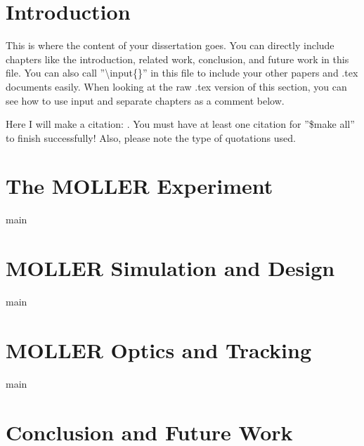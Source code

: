 \chapter{Introduction}
This is where the content of your dissertation goes.  You can directly include chapters like the introduction, related work, conclusion, and future work in this file.  You can also call ''\textbackslash input\{\}'' in this file to include your other papers and .tex documents easily.  When looking at the raw .tex version of this section, you can see how to use input and separate chapters as a comment below.

Here I will make a citation: \cite{mobile_marketshare}.  You must have at least one citation for ''\$make all'' to finish successfully!  Also, please note the type of quotations used.




%


\chapter{The MOLLER Experiment}
\label{cht:MOLLER}
{main}
\setcounter{equation}{0}
\cleardoublepage

\chapter{MOLLER Simulation and Design}
\label{cht:MOLLER_sim_des}
{main}
\setcounter{equation}{0}
\cleardoublepage

\chapter{MOLLER Optics and Tracking}
\label{cht:MOLLER_optics}
{main}
\setcounter{equation}{0}
\cleardoublepage


\chapter{Conclusion and Future Work}
\label{cht:proj3}

